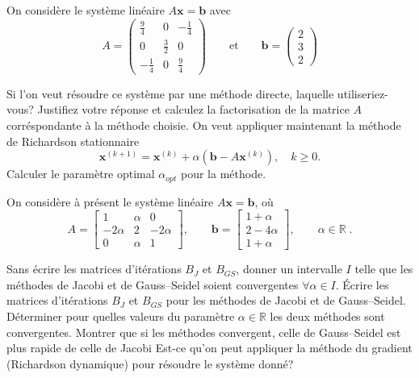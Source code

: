 \documentclass[11pt]{article}
\begin{document}
\begin{Exercise}[label={ex:3}]
\ExePart
On consid\`ere le syst\`eme lin\'eaire $A\mathbf{x} = \mathbf{b}$
avec
\[
  A = \begin{pmatrix} \frac{9}{4} & 0 & - \frac{1}{4}\\
  0 & \frac{3}{2} & 0 \\
  - \frac{1}{4} & 0 & \frac{9}{4}
  \end{pmatrix}
  \qquad \textrm{et} \qquad \mathbf{b} = \begin{pmatrix} 2 \\ 3 \\
  2 \end{pmatrix}
\]

\Question
Si l'on veut r\'esoudre ce syst\`eme par une m\'ethode directe,
laquelle utiliseriez-vous? Justifiez votre r\'eponse et calculez
la factorisation de la matrice $A$ corr\'espondante \`a la
m\'ethode choisie.
\Question
On veut appliquer maintenant la m\'ethode de Richardson
stationnaire
\[
  \mathbf{x}^{(k+1)} = \mathbf{x}^{(k)} + \alpha (\mathbf{b} - A
  \mathbf{x}^{(k)}), \quad k \geq 0.
\]
Calculer le param\`etre optimal $\alpha_{opt}$ pour la m\'ethode.


\ExePart On consid\`ere à présent le syst\`eme lin\'eaire $A\mathbf{x} = \mathbf{b}$, o\`u
\[
  A =
  \left[
  \begin{array}{ccc}
  1      & \alpha & 0 \\
  -2\alpha & 2     & -2\alpha \\
  0      & \alpha & 1
  \end{array}
  \right],
  \qquad
\mathbf{b} =
\begin{bmatrix}
1 + \alpha\\ 2 - 4\alpha \\ 1 + \alpha
\end{bmatrix},
\qquad \alpha \in \mathbb{R} \; .
\]


\Question
Sans \'ecrire les matrices d'it\'erations $B_J$ et $B_{GS}$, donner
un intervalle $I$ telle que les m\'ethodes de
Jacobi et de Gauss--Seidel soient convergentes $\forall \alpha \in I$.
\Question
\'Ecrire les matrices d'it\'erations $B_J$ et $B_{GS}$ pour les m\'ethodes de
Jacobi et de Gauss--Seidel.
\Question
D\'eterminer pour quelles valeurs du param\`etre $\alpha \in \mathbb{R}$ les
deux m\'ethodes sont convergentes.
Montrer que si les m\'ethodes convergent, celle de Gauss--Seidel est plus
rapide de celle de Jacobi
\Question
Est-ce qu'on peut appliquer la m\'ethode du gradient (Richardson dynamique)
pour r\'esoudre le syst\`eme donn\'e?



\end{Exercise}
\end{document}
